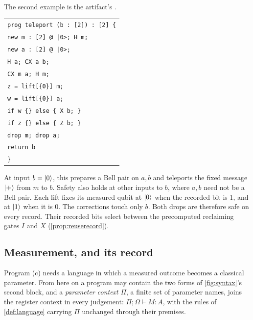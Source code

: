 \documentclass[acmsmall,screen,review,anonymous,nonacm]{acmart}
\begin{document}
The second example is the artifact's .\par\nopagebreak[4]
\noindent
\begin{minipage}[t]{0.36\linewidth}
\vspace{0pt}
\small\begin{tabular}[t]{@{}l@{}}
\texttt{prog teleport (b : [2]) : [2] \{}\\
\texttt{\quad new m : [2] @ |0>; H m;}\\
\texttt{\quad new a : [2] @ |0>;}\\
\texttt{\quad H a; CX a b;}\\
\texttt{\quad CX m a; H m;}\\
\texttt{\quad z = lift[\{0\}] m;}\\
\texttt{\quad w = lift[\{0\}] a;}\\
\texttt{\quad if w \{\} else \{ X b; \}}\\
\texttt{\quad if z \{\} else \{ Z b; \}}\\
\texttt{\quad drop m; drop a;}\\
\texttt{\quad return b}\\
\texttt{\}}\\
\end{tabular}
\end{minipage}\hfill
\begin{minipage}[t]{0.61\linewidth}
\vspace{0pt}
\raggedright
At input $b=\lvert 0 \rangle$, this prepares a Bell pair on $a,b$ and teleports
the fixed message $\lvert + \rangle$ from $m$ to $b$.
Safety also holds at other inputs to $b$, where $a,b$ need not be a Bell
pair. Each lift fixes its measured qubit at $\lvert 0 \rangle$ when the recorded bit
is $1$, and at $\lvert 1 \rangle$ when it is $0$. The corrections touch only $b$.
Both drops are therefore safe on every record. Their recorded bits select
between the precomputed reclaiming gates $I$ and $X$
(\cref{prop:reuserecord}).
\end{minipage}

\subsection{Measurement, and its record}\label{sec:meas:forms}

Program (c) needs a language in which a measured outcome becomes a classical
parameter. From here on a program may contain the two forms of
\cref{fig:syntax}'s second block, and a \emph{parameter context} $\Pi$, a finite
set of parameter names, joins the register context in every judgement:
$\Pi; \Omega \vdash M : A$, with the rules of \cref{def:language} carrying $\Pi$
unchanged through their premises.
\end{document}

